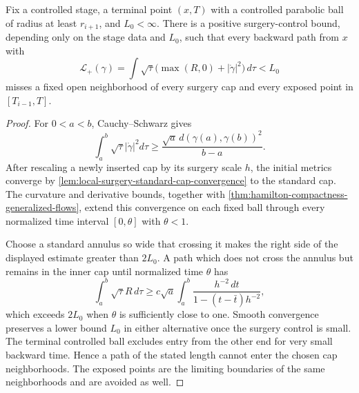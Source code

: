 \begin{lemma}
\label{lem:short-reduced-paths-avoid-surgery-caps}
\notready
Fix a controlled stage, a terminal point $(x,T)$ with a controlled
parabolic ball of radius at least $r_{i+1}$, and $L_0<\infty$.  There is a
positive surgery-control bound, depending only on the stage data and $L_0$,
such that every backward path from $x$ with
\[
 \mathcal L_+(\gamma)=\int\sqrt\tau
   \bigl(\max(R,0)+|\dot\gamma|^2\bigr)\,d\tau<L_0
\]
misses a fixed open neighborhood of every surgery cap and every exposed
point in $[T_{i-1},T]$.
\end{lemma}

\begin{proof}
For $0<a<b$, Cauchy--Schwarz gives
\[
 \int_a^b\sqrt\tau|\dot\gamma|^2d\tau
 \ge\frac{\sqrt a\,d(\gamma(a),\gamma(b))^2}{b-a}.
\]
After rescaling a newly inserted cap by its surgery scale $h$, the initial
metrics converge by \ref{lem:local-surgery-standard-cap-convergence} to the
standard cap.  The curvature and derivative bounds, together with
\ref{thm:hamilton-compactness-generalized-flows}, extend this convergence on
each fixed ball through every normalized time interval $[0,\theta]$ with
$\theta<1$.

Choose a standard annulus so wide that crossing it makes the right side of
the displayed estimate greater than $2L_0$.  A path which does not cross the
annulus but remains in the inner cap until normalized time $\theta$ has
\[
 \int_a^b\sqrt\tau R\,d\tau
 \ge c\sqrt a\int_a^b
 \frac{h^{-2}\,dt}{1-(t-\bar t)h^{-2}},
\]
which exceeds $2L_0$ when $\theta$ is sufficiently close to one.  Smooth
convergence preserves a lower bound $L_0$ in either alternative once the
surgery control is small.  The terminal controlled ball excludes entry from
the other end for very small backward time.  Hence a path of the stated
length cannot enter the chosen cap neighborhoods.  The exposed points are
the limiting boundaries of the same neighborhoods and are avoided as well.
\end{proof}

